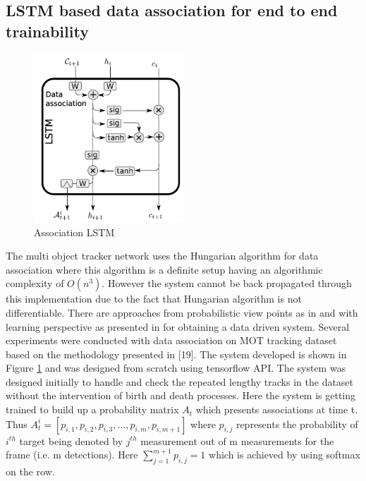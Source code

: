 \subsection{LSTM based data association for end to end trainability}

\begin{figure}[t]
	\centering
	\includegraphics[width=0.5\textwidth]{figs/lstm_associate.png}
	\vspace{-0.3cm}
	\caption{Association LSTM}
	\label{fig:LSTM_association}
	\vspace{0.5cm}
\end{figure}

The multi object tracker network uses the Hungarian algorithm for data association where this algorithm is a definite setup having an algorithmic complexity of $O(n^3)$. However the system cannot be back propagated through this implementation due to the fact that Hungarian algorithm is not differentiable. There are approaches from probabilistic view points as in \cite{russel}  and with learning perspective as presented in \cite{DeepSiam:multitarget} for obtaining a data driven system. Several experiments were conducted with data association on MOT tracking dataset based on the methodology presented in [19]. The system developed is shown in Figure \ref{fig:LSTM_association} and was designed from scratch using tensorflow API. The system was designed initially to handle and check the repeated lengthy tracks in the dataset without the intervention of birth and death processes. Here the system is getting trained to build up a probability matrix $A_t$ which presents associations at time t. Thus $A_t^i=[p_{i,1},p_{i,2},p_{i,3},\ldots,p_{i,m},p_{i,m+1}]$ where  $p_{i,j}$ represents the probability of $i^{th}$  target being denoted by $j^{th}$ measurement out of m measurements for the frame (i.e. m detections).
Here 
$\sum_{j=1}^{m+1}p_{i,j}=1$ which is achieved by using softmax on the row.

